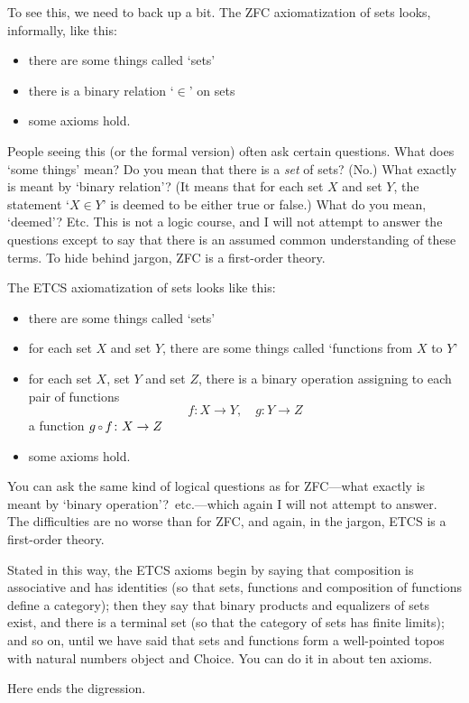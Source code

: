 \documentclass[12pt]{article}
\newcommand{\of}{\,\raisebox{0.08ex}{\ensuremath{\scriptstyle\circ}}\,}
\newcommand{\cln}{\colon}
\begin{document}
To see this, we need to back up a bit.  The ZFC axiomatization of sets looks,
informally, like this:
% 
\begin{itemize}
\item there are some things called `sets'
\item there is a binary relation `$\in$' on sets
\item some axioms hold.
\end{itemize}
% 
People seeing this (or the formal version) often ask certain questions.  What
does `some things' mean?  Do you mean that there is a \emph{set} of sets?
(No.)  What exactly is meant by `binary relation'?  (It means that for each
set $X$ and set $Y$, the statement `$X \in Y$' is deemed to be either true or
false.)  What do you mean, `deemed'?  Etc.  This is not a logic course, and I
will not attempt to answer the questions except to say that there is an
assumed common understanding of these terms.  To hide behind jargon, ZFC is a
first-order theory.

The ETCS axiomatization of sets looks like this:
% 
\begin{itemize}
\item there are some things called `sets'
\item for each set $X$ and set $Y$, there are some things called `functions
from $X$ to $Y$'
\item for each set $X$, set $Y$ and set $Z$, there is a binary operation
assigning to each pair of functions
\[
f\cln X \to Y, 
\quad
g\cln Y \to Z
\]
a function $g \of f\cln X \to Z$
\item some axioms hold.
\end{itemize}
% 
You can ask the same kind of logical questions as for ZFC---what exactly is
meant by `binary operation'?\ etc.---which again I will not attempt to
answer.  The difficulties are no worse than for ZFC, and again, in the jargon,
ETCS is a first-order theory.  

Stated in this way, the ETCS axioms begin by saying that composition is
associative and has identities (so that sets, functions and composition of
functions define a category); then they say that binary products and
equalizers of sets exist, and there is a terminal set (so that the category of
sets has finite limits); and so on, until we have said that sets and functions
form a well-pointed topos with natural numbers object and Choice.  You can do
it in about ten axioms.

Here ends the digression.

\bigskip
\end{document}
